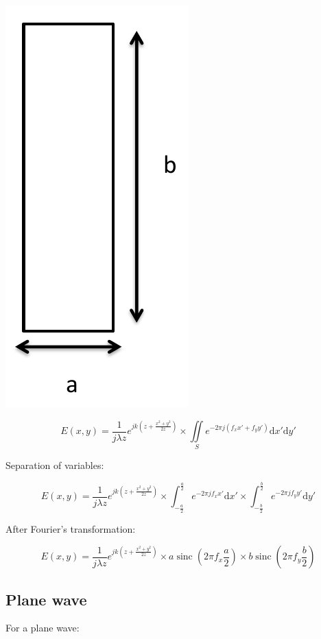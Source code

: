 \documentclass[10pt,a4paper]{article}
\DeclareMathOperator{\sinc}{sinc}
\begin{document}
\begin{center}
\includegraphics[scale=0.3]{../Ressources/schema-4-1.png}
\end{center}

\[
E(x,y)=\frac{1}{j\lambda z} e^{jk\left(z+\frac{x^2+y^2}{2z}\right)}
\times \iint\limits_S e^{-2\pi j(f_xx'+f_yy')}\mathrm{d}x'\mathrm{d}y'
\]

Separation of variables:

\[
E(x,y)=\frac{1}{j\lambda z} e^{jk\left(z+\frac{x^2+y^2}{2z}\right)}
\times \int_{-\frac{a}{2}}^\frac{a}{2} e^{-2\pi jf_xx'}\mathrm{d}x'
\times \int_{-\frac{b}{2}}^\frac{b}{2} e^{-2\pi jf_yy'}\mathrm{d}y'
\]

After Fourier’s transformation:

\[
E(x,y)=\frac{1}{j\lambda z} e^{jk\left(z+\frac{x^2+y^2}{2z}\right)}
\times a\sinc\left(2\pi f_x \frac{a}{2}\right)
\times b\sinc\left(2\pi f_y \frac{b}{2}\right)
\]

	\subsection{Plane wave}
For a plane wave:
\end{document}

